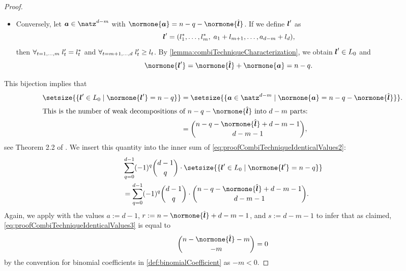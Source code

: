 \begin{proof}
\begin{itemize}
    \item
    Conversely, let $\*a \in \natz^{d-m}$ with
    $\normone{\*a} = n - q - \normone{\hat{\*l}}$.
    If we define ${\boldsymbol{l}}'$ as
    \begin{equation}
      {\boldsymbol{l}}'
      = (l^\ast_1, \dotsc, l^\ast_m,\;
      a_1 + l_{m+1}, \dotsc, a_{d-m} + l_d),
    \end{equation}
    then $\forall_{t=1,\dotsc,m}\;l'_t = l^\ast_t$ and
    $\forall_{t=m+1,\dotsc,d}\;l'_t \ge l_t$.
    By \cref{lemma:combiTechniqueCharacterization},
    we obtain ${\boldsymbol{l}}' \in L_0$ and
    \begin{equation}
      \normone{\*l'}
      = \normone{\hat{\*l}} + \normone{\*a}
      = n - q.
    \end{equation}
  \end{itemize}
  This bijection implies that
  \begin{subequations}
    \begin{align}
      \setsize{\{\*l' \in L_0 \mid \normone{\*l'} = n - q\}}
      &= \setsize{
        \{\*a \in \natz^{d-m} \mid \normone{\*a} = n - q - \normone{\hat{\*l}}\}
      }.\\
      \intertext{%
        This is the number of weak decompositions of
        $n - q - \normone{\hat{\*l}}$ into $d - m$ parts:%
      }
      &= \binom{n - q - \normone{\hat{\*l}} + d - m - 1}{d - m - 1},
    \end{align}
  \end{subequations}
  see Theorem 2.2 of \cite{Bona15Introduction}.
  We insert this quantity into the inner sum of
  \eqref{eq:proofCombiTechniqueIdenticalValues2}:
  \begin{subequations}
    \label{eq:proofCombiTechniqueIdenticalValues3}
    \begin{align}
      &\sum_{q=0}^{d-1}
      (-1)^q \binom{d-1}{q} \cdot
      \setsize{\{\*l' \in L_0 \mid \normone{\*l'} = n - q\}}\\
      &= \sum_{q=0}^{d-1} (-1)^q \binom{d-1}{q} \cdot
      \binom{n - q - \normone{\hat{\*l}} + d - m - 1}{d - m - 1}.
    \end{align}
  \end{subequations}
  Again, we apply 
  with the values $a := d - 1$,
  $r := n - \normone{\hat{\*l}} + d - m - 1$, and
  $s := d - m - 1$ to infer that as claimed,
  \eqref{eq:proofCombiTechniqueIdenticalValues3} is equal to
  \begin{equation}
  \label{eq:proofCombiTechniqueIdenticalValues4}
    \binom{n - \normone{\hat{\*l}} - m}{-m}
    = 0
  \end{equation}
  by the convention for binomial coefficients in \cref{def:binomialCoefficient}
  as $-m < 0$.
  

\end{proof}
